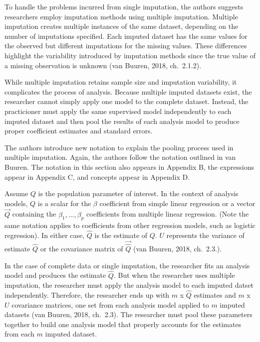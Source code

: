 \documentclass[12pt,oneside]{chicagocapstone}
\begin{document}
To handle the problems incurred from single imputation, the authors
suggests researchers employ imputation methods using multiple
imputation. Multiple imputation creates multiple instances of the same
dataset, depending on the number of imputations specified. Each imputed
dataset has the same values for the observed but different imputations
for the missing values. These differences highlight the variability
introduced by imputation methods since the true value of a missing
observation is unknown (van Buuren, 2018, ch.~2.1.2).

While multiple imputation retains sample size and imputation
variability, it complicates the process of analysis. Because multiple
imputed datasets exist, the researcher cannot simply apply one model to
the complete dataset. Instead, the practicioner must apply the same
supervised model independently to each imputed dataset and then pool the
results of each analysis model to produce proper coefficient estimates
and standard errors.

The authors introduce new notation to explain the pooling process used
in multiple imputation. Again, the authors follow the notation outlined
in van Buuren. The notation in this section also appears in Appendix B,
the expressions appear in Appendix C, and concepts appear in Appendix D.

Assume \(Q\) is the population parameter of interest. In the context of
analysis models, \(Q\) is a scalar for the \(\beta\) coefficient from
simple linear regression or a vector \(\vec{Q}\) containing the
\(\beta_1,...,\beta_p\) coefficients from multiple linear regression.
(Note the same notation applies to coefficients from other regression
models, such as logistic regression). In either case, \(\hat{Q}\) is the
estimate of \(Q\). \(U\) represents the variance of estimate \(\hat Q\)
or the covariance matrix of \(\vec{\hat Q}\) (van Buuren, 2018,
ch.~2.3.).

In the case of complete data or single imputation, the researcher fits
an analysis model and produces the estimate \(\hat{Q}\). But when the
researcher uses multiple imputation, the researcher must apply the
analysis model to each imputed datset independently. Therefore, the
researcher ends up with \(m\) x \(\hat{Q}\) estimates and \(m\) x \(U\)
covariance matrices, one set from each analysis model applied to \(m\)
imputed datasets (van Buuren, 2018, ch.~2.3). The researcher must pool
these parameters together to build one analysis model that properly
accounts for the estimates from each \(m\) imputed dataset.
\end{document}
